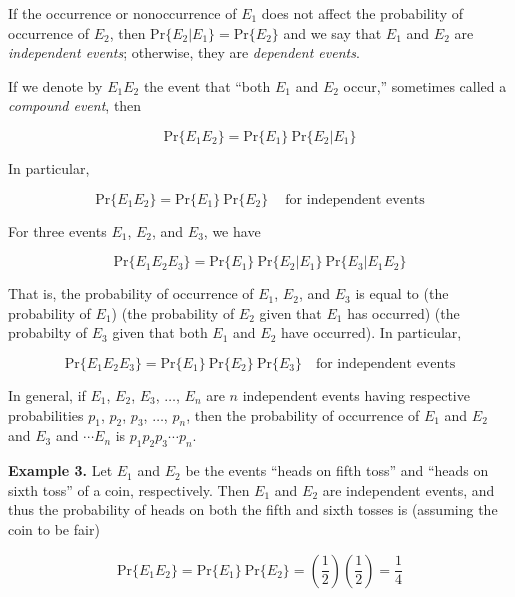 \documentclass[
]{article}
\begin{document}
If the occurrence or nonoccurrence of \(E_1\) does not affect the
probability of occurrence of \(E_2\), then
\(\text{Pr}\{E_2|E_1\} = \text{Pr}\{E_2\}\) and we say that \(E_1\) and
\(E_2\) are \emph{independent events}; otherwise, they are
\emph{dependent events}.

If we denote by \(E_1E_2\) the event that ``both \(E_1\) and \(E_2\)
occur,'' sometimes called a \emph{compound event}, then

\begin{equation}
\text{Pr}\{E_1E_2\} = \text{Pr}\{E_1\}\ \text{Pr}\{E_2|E_1\}
\end{equation}

In particular,

\begin{equation}
\text{Pr}\{E_1E_2\} = \text{Pr}\{E_1\}\ \text{Pr}\{E_2\}
\ \ \ \ \text{ for independent events}
\end{equation}

For three events \(E_1\), \(E_2\), and \(E_3\), we have

\begin{equation}
\text{Pr}\{E_1 E_2 E_3\} = \text{Pr}\{E_1\}\ \text{Pr}\{E_2|E_1\}
\ \text{Pr}\{E_3|E_1 E_2\}
\end{equation}

That is, the probability of occurrence of \(E_1\), \(E_2\), and \(E_3\)
is equal to (the probability of \(E_1\)) \times (the probability of
\(E_2\) given that \(E_1\) has occurred) \times (the probabilty of
\(E_3\) given that both \(E_1\) and \(E_2\) have occurred). In
particular,

\begin{equation}
\text{Pr}\{E_1 E_2 E_3\} = \text{Pr}\{E_1\}\ \text{Pr}\{E_2\}\ \text{Pr}\{E_3\}
\ \ \ \text{ for independent events}
\end{equation}

In general, if \(E_1\), \(E_2\), \(E_3\), \(\ldots\), \(E_n\) are \(n\)
independent events having respective probabilities \(p_1\), \(p_2\),
\(p_3\), \(\ldots\), \(p_n\), then the probability of occurrence of
\(E_1\) and \(E_2\) and \(E_3\) and \(\cdots E_n\) is
\(p_1 p_2 p_3 \cdots p_n\).

\textbf{Example 3.} Let \(E_1\) and \(E_2\) be the events ``heads on
fifth toss'' and ``heads on sixth toss'' of a coin, respectively. Then
\(E_1\) and \(E_2\) are independent events, and thus the probability of
heads on both the fifth and sixth tosses is (assuming the coin to be
fair)

\[
\text{Pr}\{E_1 E_2\} = \text{Pr}\{E_1\}\ \text{Pr}\{E_2\}
  = \left(\frac{1}{2}\right) \left( \frac{1}{2} \right) = \frac{1}{4}
\]
\end{document}
